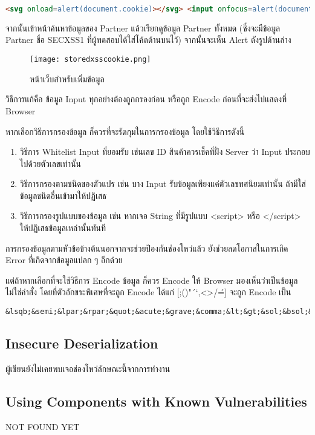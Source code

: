  \begin{lstlisting}[language=html,numbers=none] 
<svg onload=alert(document.cookie)></svg> <input onfocus=alert(document.cookie) autofocus>
\end{lstlisting}

จากนั้นเข้าหน้าค้นหาข้อมูลของ Partner แล้วเรียกดูข้อมูล Partner ทั้งหมด (ซึ่งจะมีข้อมูล Partner ชื่อ SECXSS1 ที่ผู้ทดสอบได้ใส่โค้ดด้านบนไว้) จากนั้นจะเห็น Alert ดังรูปด้านล่าง

\begin{figure}[h]
	\centering
	\texttt{[image: storedxsscookie.png]}
	\caption{หน้าเว็บสำหรับเพิ่มข้อมูล}
	\label{Fig:storedxsscookie.png}
\end{figure}

วิธีการแก้คือ ข้อมูล Input ทุกอย่างต้องถูกกรองก่อน หรือถูก Encode ก่อนที่จะส่งไปแสดงที่ Browser

หากเลือกวิธีการกรองข้อมูล ก็ควรที่จะรัดกุมในการกรองข้อมูล โดยใช้วิธีการดังนี้

\begin{enumerate}
	\item วิธีการ Whitelist Input ที่ยอมรับ เช่นเลข ID สินค้าควรเช็คที่ฝั่ง Server ว่า Input ประกอบไปด้วยตัวเลขเท่านั้น
	\item วิธีการกรองตามชนิดของตัวแปร เช่น บาง Input รับข้อมูลเพียงแค่ตัวเลขทศนิยมเท่านั้น ถ้ามีใส่ข้อมูลชนิดอื่นเข้ามาให้ปฏิเสธ
	\item วิธีการกรองรูปแบบของข้อมูล เช่น หากเจอ String ที่มีรูปแบบ <script> หรือ </script> ให้ปฏิเสธข้อมูลเหล่านั้นทันที
\end{enumerate}

การกรองข้อมูลตามหัวข้อข้างต้นนอกจากจะช่วยป้องกันช่องโหว่แล้ว ยังช่วยลดโอกาสในการเกิด Error ที่เกิดจากข้อมูลแปลก ๆ อีกด้วย

แต่ถ้าหากเลือกที่จะใช้วิธีการ Encode ข้อมูล ก็ควร Encode ให้ Browser มองเห็นว่าเป็นข้อมูลไม่ใช่คำสั่ง โดยที่ตัวอักขระพิเศษที่จะถูก Encode ได้แก่ [;()"´`,<>/\'=] จะถูก Encode เป็น

 \begin{lstlisting}[numbers=none]
&lsqb;&semi;&lpar;&rpar;&quot;&acute;&grave;&comma;&lt;&gt;&sol;&bsol;&apos;&equals;&rsqb;
\end{lstlisting}

\subsection{Insecure Deserialization}
ผู้เขียนยังไม่เคยพบเจอช่องโหว่ลักษณะนี้จากการทำงาน
\subsection{Using Components with Known Vulnerabilities}
NOT FOUND YET
